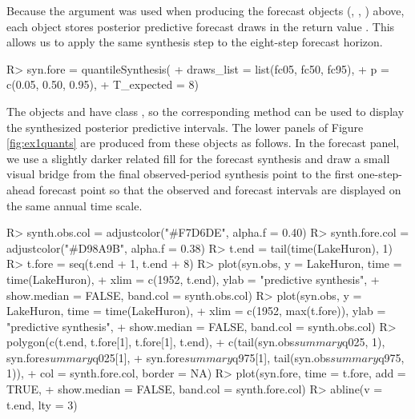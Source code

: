 \documentclass[jss]{jss}
\begin{document}
Because the argument  was used when producing the forecast objects (, , ) above, each object stores posterior predictive forecast draws in the return value . This allows us to apply the same synthesis step to the eight-step forecast horizon.

\begin{CodeChunk}
\begin{CodeInput}
R> syn.fore = quantileSynthesis(
+               draws_list = list(fc05, fc50, fc95),
+               p = c(0.05, 0.50, 0.95),
+               T_expected = 8)
\end{CodeInput}
\end{CodeChunk}

The objects  and  have class , so the corresponding  method can be used to display the synthesized posterior predictive intervals. The lower panels of Figure \ref{fig:ex1quants} are produced from these objects as follows. In the forecast panel, we use a slightly darker related fill for the forecast synthesis and draw a small visual bridge from the final observed-period synthesis point to the first one-step-ahead forecast point so that the observed and forecast intervals are displayed on the same annual time scale.

\begin{CodeChunk}
\begin{CodeInput}
R> synth.obs.col = adjustcolor("#F7D6DE", alpha.f = 0.40)
R> synth.fore.col = adjustcolor("#D98A9B", alpha.f = 0.38)
R> t.end = tail(time(LakeHuron), 1)
R> t.fore = seq(t.end + 1, t.end + 8)
R> plot(syn.obs, y = LakeHuron, time = time(LakeHuron),
+       xlim = c(1952, t.end), ylab = "predictive synthesis",
+       show.median = FALSE, band.col = synth.obs.col)
R> plot(syn.obs, y = LakeHuron, time = time(LakeHuron),
+       xlim = c(1952, max(t.fore)), ylab = "predictive synthesis",
+       show.median = FALSE, band.col = synth.obs.col)
R> polygon(c(t.end, t.fore[1], t.fore[1], t.end),
+          c(tail(syn.obs$summary$q025, 1), syn.fore$summary$q025[1],
+            syn.fore$summary$q975[1], tail(syn.obs$summary$q975, 1)),
+          col = synth.fore.col, border = NA)
R> plot(syn.fore, time = t.fore, add = TRUE,
+       show.median = FALSE, band.col = synth.fore.col)
R> abline(v = t.end, lty = 3)
\end{CodeInput}
\end{CodeChunk}

\end{document}
